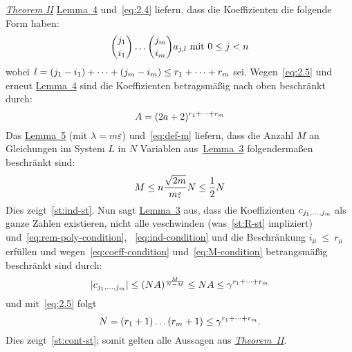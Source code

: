 \begin{namedproof}{\emph{\hyperref[subsec:th2]{Theorem II}}}
            \hyperref[subsec:lemma4]{Lemma~4} und~\eqref{eq:2.4} liefern, dass die Koeffizienten die folgende Form haben:
            \begin{equation*}
                \binom{j_1}{i_1} \dots \binom{j_m}{i_m}a_{j,l} \ \textrm{mit}\  0 \leq j < n
            \end{equation*}
            wobei $l = (j_1 - i_1) + \dots + (j_m - i_m) \leq r_1 + \dots + r_m$ sei.
            \textrm{Wegen~\eqref{eq:2.5} und erneut \hyperref[subsec:lemma4]{Lemma~4} sind die Koeffizienten betragsmäßig
            nach oben beschränkt durch:}
            \begin{equation}
                A = (2a + 2)^{r_1 + \dots + r_m} \label{eq:coeff-condition}
            \end{equation}
            \textrm{Das \hyperref[subsec:lemma5]{Lemma~5} (mit $\lambda = m \varepsilon$) und~\eqref{eq:def-m} liefern,
            dass die Anzahl $M$ an Gleichungen im System $L$ in $N$ Variablen aus~\hyperref[subsec:lemma3]{Lemma~3}
            folgendermaßen beschränkt sind:}
            \begin{equation}
                M \leq n \frac{\sqrt{2m}}{m \varepsilon} N \leq \frac{1}{2} N \label{eq:M-condition}
            \end{equation}
            Dies zeigt~\ref{st:ind-st}.
            \newline
            \textrm{Nun sagt \hyperref[subsec:lemma3]{Lemma~3} aus, dass die Koeffizienten $c_{j_1, \dots, j_m}$ als ganze
            Zahlen existieren, nicht alle veschwinden (was~\ref{st:R-st} impliziert) und~\eqref{eq:rem-poly-condition},
            ~\eqref{eq:ind-condition} und die Beschränkung $i_\mu~\leq~r_\mu$ erfüllen und wegen~\eqref{eq:coeff-condition}
            und~\eqref{eq:M-condition} betrangsmäßig beschränkt sind durch:}
            \begin{equation*}
                \left| c_{j_1, \dots, j_m} \right| \leq (NA)^{\frac{M}{N-M}} \leq NA \leq \gamma^{r_1 + \dots + r_m}
            \end{equation*}
            und mit~\eqref{eq:2.5} folgt
            \begin{equation*}
                N = (r_1 + 1) \dots (r_m + 1) \leq \gamma^{r_1 + \dots + r_m}.
            \end{equation*}
            Dies zeigt~\ref{st:cont-st}; somit gelten alle Aussagen aus \hyperref[subsec:th2]{\emph{Theorem~II}}.
        \end{namedproof}
    
